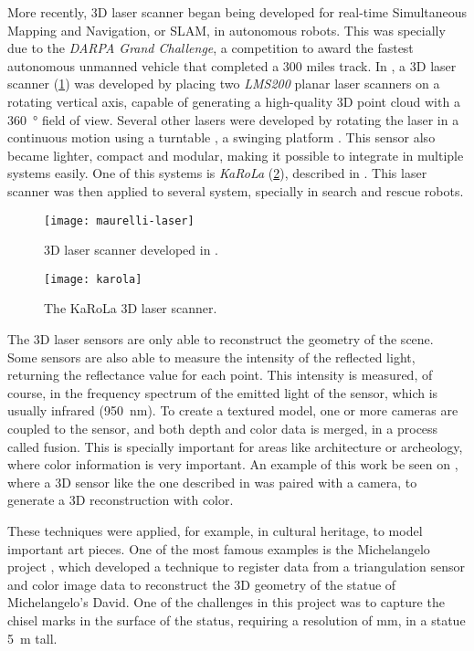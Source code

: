 More recently, 3D laser scanner began being developed for real-time Simultaneous Mapping and Navigation, or SLAM, in autonomous robots. This was specially due to the \textit{DARPA Grand Challenge}, a competition to award the fastest autonomous unmanned vehicle that completed a 300 miles track. In \cite{maurelli09}, a 3D laser scanner (\cref{fig:maurelli-laser-scanner}) was developed by placing two \textit{LMS200} planar laser scanners on a rotating vertical axis, capable of generating a high-quality 3D point cloud with a \SI{360}{\degree} field of view. Several other lasers were developed by rotating the laser in a continuous motion using a turntable \cite{nemoto07}, a swinging platform \cite{yoshida11}. This sensor also became lighter, compact and modular, making it possible to integrate in multiple systems easily. One of this systems is \textit{KaRoLa} (\cref{fig:karola}), described in \cite{pfotzer14}. This laser scanner was then applied to several system, specially in search and rescue robots.

\begin{figure}[h]
    \centering
    \texttt{[image: maurelli-laser]}
    \caption{3D laser scanner developed in \cite{maurelli09}.}
    \label{fig:maurelli-laser-scanner}
\end{figure}

\begin{figure}[h]
    \centering
    \texttt{[image: karola]}
    \caption{The KaRoLa 3D laser scanner.}
    \label{fig:karola}
\end{figure}

The 3D laser sensors are only able to reconstruct the geometry of the scene. Some sensors are also able to measure the intensity of the reflected light, returning the reflectance value for each point. This intensity is measured, of course, in the frequency spectrum of the emitted light of the sensor, which is usually infrared (\SI{950}{\nano\meter}). To create a textured model, one or more cameras are coupled to the sensor, and both depth and color data is merged, in a process called fusion. This is specially important for areas like architecture or archeology, where color information is very important. An example of this work be seen on \cite{pdias06}, where a 3D sensor like the one described in \cite{surmann03} was paired with a camera, to generate a 3D reconstruction with color. 

These techniques were applied, for example, in cultural heritage, to model important art pieces. One of the most famous examples is the Michelangelo project \cite{levoy00}, which developed a technique to register data from a triangulation sensor and color image data to reconstruct the 3D geometry of the statue of Michelangelo's David. One of the challenges in this project was to capture the chisel marks in the surface of the status, requiring a resolution of  \si{\milli\meter}, in a statue \SI{5}{\meter} tall.

